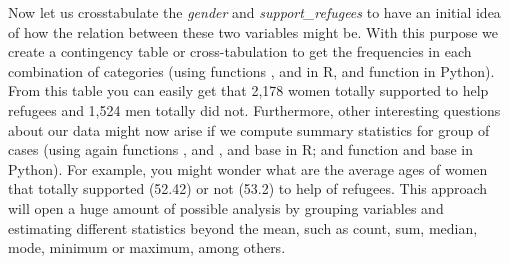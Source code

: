 Now let us crosstabulate the \textit{gender} and \textit{support\_refugees} to have an initial idea of how the relation between these two variables might be. With this purpose we create a contingency table or cross-tabulation to get the frequencies in each combination of categories (using  functions ,  and  in R, and  function  in Python). From this table you can easily get that 2,178 women totally supported to help refugees and 1,524 men totally did not.  Furthermore, other interesting questions about our data might now arise if we compute summary statistics for group of cases (using again  functions ,  and , and base  in R; and  function  and base  in Python). For example, you might wonder what are the average ages of women that totally supported (52.42) or not (53.2) to help of refugees.  This approach will open a huge amount of possible analysis by grouping variables and estimating different statistics beyond the mean, such as count, sum, median, mode, minimum or maximum, among others.

